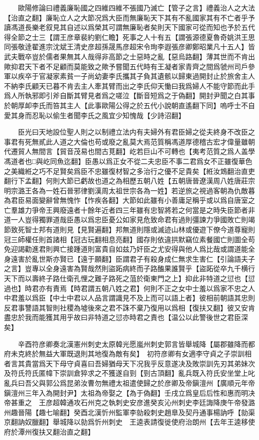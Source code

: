 　　歐陽修論曰禮義廉恥國之四維四維不張國乃滅亡【管子之言】禮義治人之大法【治直之翻】廉恥立人之大節况爲大臣而無廉恥天下其有不亂國家其有不亡者乎予讀馮道長樂老叙見其自述以爲榮其可謂無廉恥者矣則天下國家可從而知也予於五代得全節之士三【謂王彦章裴約劉仁瞻】死事之人十有五【謂張源德夏魯奇姚洪王思同張敬逹翟進宗沈斌王清史彦超孫晟馬彦超宋令珣李遐張彦卿鄭昭業凡十五人】皆武夫戰卒豈於儒者果無其人哉得非高節之士惡時之亂【惡烏路翻】薄其世而不肯出歟抑君天下者不足顧而莫能致之歟予嘗聞五代時有王凝者家青齊之間爲虢州司戶參軍以疾卒于官凝家素貧一子尚幼妻李氏攜其子負其遺骸以歸東過開封止於旅舍主人不納李氏顧天已暮不肯去主人牽其臂而出之李氏仰天慟曰我爲婦人不能守節而此手爲人所執邪即引斧自斷其臂見者爲之嗟泣【斷音短爲之于偽翻】開封尹聞之白其事於朝厚卹李氏而笞其主人【此事歐陽公得之於五代小說朝直遙翻下同】嗚呼士不自愛其身而忍恥以偷生者聞李氏之風宜少知愧哉【少詩沼翻】

　　臣光曰天地設位聖人則之以制禮立法内有夫婦外有君臣婦之從夫終身不改臣之事君有死無貳此人道之大倫也苟或廢之亂莫大焉范質稱馮道厚德稽古宏才偉量雖朝代遷貿人無間言【貿音茂易也間古莧翻】屹若巨山不可轉也【夷考范質之爲人盖學馮道者也□與屹同魚迄翻】臣愚以爲正女不從二夫忠臣不事二君爲女不正雖復華色之美織絍之巧不足賢矣爲臣不忠雖復材智之多治行之優不足貴矣【絍汝鴆翻治直吏翻行下孟翻】何則大節已虧故也道之為相歷五朝八姓【五朝唐晉遼漢周八姓唐莊宗明宗潞王各為一姓石晉邪律劉漢周太祖世宗各為一姓】若逆旅之視過客朝為仇敵暮為君臣易面變辭曾無愧怍【怍疾各翻】大節如此雖有小善庸足稱乎或以爲自唐室之亡羣雄力爭帝王興廢遠者十餘年近者四三年雖有忠智將若之何當是之時失臣節者非道一人豈得獨罪道哉臣愚以爲忠臣憂公如家見危致命君有過則彊諫力爭國敗亡則竭節致死智士邦有道則見【見賢遍翻】邦無道則隱或滅迹山林或優遊下僚今道尊寵則冠三師權任則首諸相【冠古玩翻相息亮翻】國存則依違拱默竊位素餐國亡則圖全苟免迎謁勸進君則興亡接踵道則富貴自如兹乃奸臣之尤安得與他人爲比哉或謂道能全身遠害於亂世斯亦賢已【遠于願翻】臣謂君子有殺身成仁無求生害仁【引論語夫子之言】豈專以全身遠害為賢哉然則盜跖病終而子路醢果誰賢乎【盜跖從卒九千横行天下而以壽終子路仕衛孔悝之難子路死之菹於衛東門之上】抑此非特道之愆也【愆過也】時君亦有責焉【時君謂五朝八姓之君】何則不正之女中士羞以爲家不忠之人中君羞以爲臣【中士中君以人品言謂識見不及上而可以語上者】彼相前朝語其忠則反君事讐語其智則社稷為墟後來之君不誅不棄乃復用以爲相【復扶又翻】彼又安肯盡忠於我而能獲其用乎故曰非特道之愆亦時君之責也【温公以此警後世之君臣深矣】

　　辛酉符彦卿奏北漢憲州刺史太原韓光愿嵐州刺史郭言皆舉城降【屬郡雖降而都府未克終於無益大軍既退則其地復為敵有矣】　初符彦卿有女適李守貞之子崇訓相者言其貴當爲天下母守貞喜曰吾婦猶母天下况我乎反意遂决及敗崇訓先刃其弟妹次及符氏符氏匿幃下崇訓倉猝求之不獲遂自剄【剄古頂翻】亂兵既入符氏安坐堂上叱亂兵曰吾父與郭公爲昆弟汝曹勿無禮太祖遣使歸之於彦卿及帝鎭澶州【廣順元年帝鎭澶州三年入為開封尹】太祖為帝娶之【為于偽翻】壬戌立爲皇后后性和惠而明决帝甚重之　王彦超韓通攻石州克之執刺史安彦進癸亥沁州刺史李廷誨降庚午帝發潞州趣晉陽【趣七喻翻】癸酉北漢忻州監軍李勍殺刺史趙臯及契丹通事楊訥呼【勍渠京翻訥奴臘翻】舉城降以勍爲忻州刺史　王逵表請復徙使府治朗州【去年王逵移使府於潭州復扶又翻治直之翻】

